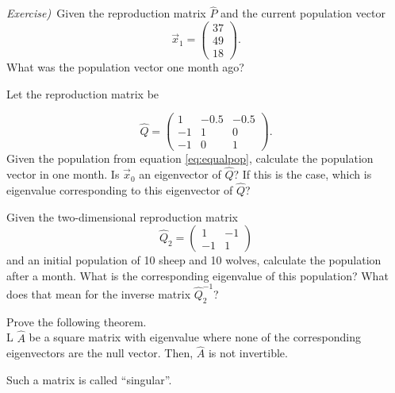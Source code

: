    \emph{Exercise)}\ Given the reproduction matrix $\hat P$ and the
   current population vector
   \begin{equation}
       \vec x_1 = \left(\begin{matrix}
               37\\
               49\\
               18
           \end{matrix}\right).
   \end{equation}
   What was the population vector one month ago?

 \subexercise[%
     topic={Eigenpopulations},
    ]

    Let the reproduction matrix be

  \begin{equation}
      \hat Q = 
      \left(
      \begin{matrix}
          1    & -0.5   & -0.5 \\
          -1  & 1 & 0 \\
          -1  & 0   & 1 
      \end{matrix}
  \right).
   \end{equation}
   Given the population from equation \ref{eq:equalpop}, calculate the
   population vector in one month. Is $\vec x_0$ an eigenvector of $\hat
   Q$? If this is the case, which is  eigenvalue corresponding to this
   eigenvector of $\hat Q$?

   Given the two-dimensional reproduction matrix
  \begin{equation}
      \hat Q_2 = 
      \left(
      \begin{matrix}
          1    & -1 \\
          -1  & 1
      \end{matrix}
  \right)
   \end{equation}
   and an initial population of 10 sheep and 10 wolves, calculate the
   population after a month. What is the corresponding eigenvalue of
   this population? What does that mean for the inverse matrix
   $\hat Q_2^{-1}$?
   
    \subexercise[%
     topic={Inverse of a Singular Matrix},
    ]
    Prove the following theorem.\ \\

    L $\hat A$ be a square matrix with eigenvalue where none of the
    corresponding eigenvectors are the null vector. Then, $\hat A$ is
    not invertible.

    Such a matrix is called ``singular''.



